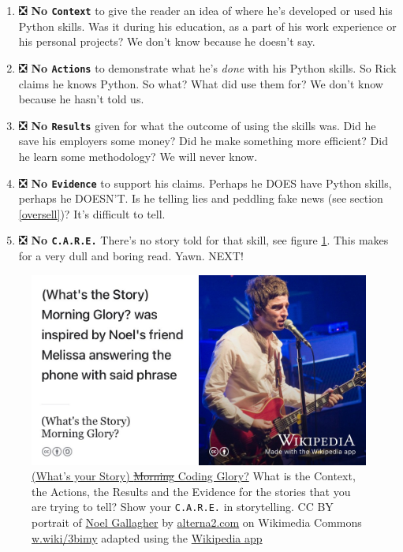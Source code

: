 \documentclass[
]{book}
\providecommand{\tightlist}{%
  \setlength{\itemsep}{0pt}\setlength{\parskip}{0pt}}
\begin{document}
\begin{enumerate}
\def\labelenumi{\arabic{enumi}.}
\tightlist
\item
  ❎ \textbf{No \texttt{Context}} to give the reader an idea of where he's developed or used his Python skills. Was it during his education, as a part of his work experience or his personal projects? We don't know because he doesn't say.\\
\item
  ❎ \textbf{No \texttt{Actions}} to demonstrate what he's \emph{done} with his Python skills. So Rick claims he knows Python. So what? What did use them for? We don't know because he hasn't told us.
\item
  ❎ \textbf{No \texttt{Results}} given for what the outcome of using the skills was. Did he save his employers some money? Did he make something more efficient? Did he learn some methodology? We will never know.\\
\item
  ❎ \textbf{No \texttt{Evidence}} to support his claims. Perhaps he DOES have Python skills, perhaps he DOESN'T. Is he telling lies and peddling fake news (see section \ref{oversell})? It's difficult to tell.
\item
  ❎ \textbf{No \texttt{C.A.R.E.}} There's no story told for that skill, see figure \ref{fig:gallagher-fig}. This makes for a very dull and boring read. Yawn. NEXT! 🥱
\end{enumerate}

\begin{figure}

{\centering \includegraphics[width=1\linewidth]{images/whats-the-story} 

}

\caption{\href{https://en.wikipedia.org/wiki/(What\%27s_the_Story)_Morning_Glory\%3F}{(What's your Story) \sout{Morning} Coding Glory?} \citep{whatsthestory} What is the Context, the Actions, the Results and the Evidence for the stories that you are trying to tell? Show your \texttt{C.A.R.E.} in storytelling. CC BY portrait of \href{https://en.wikipedia.org/wiki/Noel_Gallagher}{Noel Gallagher} by \href{https://alterna2.com/}{alterna2.com} on Wikimedia Commons \href{https://w.wiki/3bim}{w.wiki/3bimy} adapted using the \href{https://apps.apple.com/us/app/wikipedia/id324715238}{Wikipedia app}}\label{fig:gallagher-fig}
\end{figure}
\end{document}
